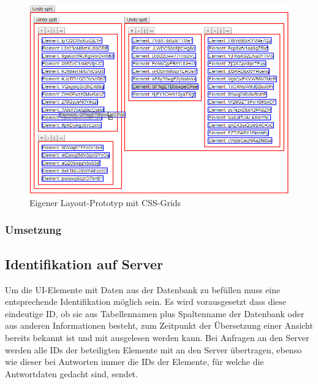 \begin{figure}
    \centering
    \captionsetup{justification=centering}
    \includegraphics[width=\textwidth]{figures/layout_grid_test.png}
        \caption{Eigener Layout-Prototyp mit CSS-Grids}\label{fig:layout_grid_test}
\end{figure}

\subsubsection{Umsetzung}\label{subsec:layout}

\subsection{Identifikation auf Server}
Um die UI-Elemente mit Daten aus der Datenbank zu befüllen muss eine entsprechende Identifikation möglich sein. Es wird vorausgesetzt dass diese eindeutige ID, ob sie aus Tabellennamen plus Spaltenname der Datenbank oder aus anderen Informationen besteht, zum Zeitpunkt der Übersetzung einer Ansicht bereits bekannt ist und mit ausgelesen werden kann. Bei Anfragen an den Server werden alle IDs der beteiligten Elemente mit an den Server übertragen, ebenso wie dieser bei Antworten immer die IDs der Elemente, für welche die Antwortdaten gedacht sind, sendet.

